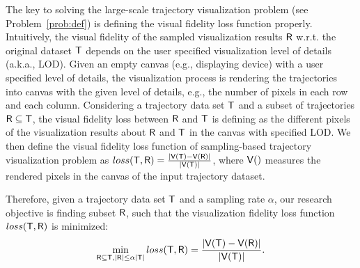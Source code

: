 The key to solving the large-scale trajectory visualization problem (see Problem~\ref{prob:def}) is defining the visual fidelity loss function properly.
Intuitively, the visual fidelity of the sampled visualization results $\mathsf{R}$ w.r.t. the original dataset $\mathsf{T}$ depends on the user specified visualization level of details (a.k.a., LOD).
Given an empty canvas (e.g., displaying device) with a user specified level of details,
the visualization process is rendering the trajectories into canvas with the given level of details, e.g., the number of pixels in each row and each column.
Considering a trajectory data set $\mathsf{T}$ and a subset of trajectories $\mathsf{R} \subseteq \mathsf{T}$,
the visual fidelity loss between $\mathsf{R}$ and $\mathsf{T}$ is defining as the different pixels of the visualization results about $\mathsf{R}$ and $\mathsf{T}$ in the canvas with specified LOD.
We then define the visual fidelity loss function of sampling-based trajectory visualization problem as $loss(\mathsf{T}, \mathsf{R}) = \frac{|\mathsf{V}(\mathsf{T}) - \mathsf{V}(\mathsf{R})|}{|\mathsf{V}(\mathsf{T})|}$,
where $\mathsf{V}()$ measures the rendered pixels in the canvas of the input trajectory dataset.

Therefore, given a trajectory data set $\mathsf{T}$ and a sampling rate $\alpha$,
our research objective is finding subset $\mathsf{R}$, such that  the visualization fidelity loss function $loss(\mathsf{T}, \mathsf{R})$ is minimized:
$$ \min_{\mathsf{R} \subseteq \mathsf{T}, |\mathsf{R}| \leq \alpha |\mathsf{T}|}  loss(\mathsf{T}, \mathsf{R}) =  \frac{|\mathsf{V}(\mathsf{T}) - \mathsf{V}(\mathsf{R})|}{|\mathsf{V}(\mathsf{T})|}. $$ %






